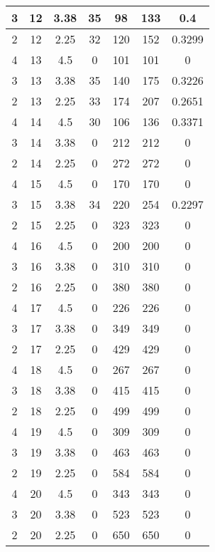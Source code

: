 \documentclass[letterpaper, 12pt]{article}
\begin{document}
\begin{longtable}{|c|c|c|c|c|c|c|}
\hline
3 & 12 & 3.38 & 35 & 98 & 133 & 0.4 \\
\hline
2 & 12 & 2.25 & 32 & 120 & 152 & 0.3299 \\
\hline
4 & 13 & 4.5 & 0 & 101 & 101 & 0 \\
\hline
3 & 13 & 3.38 & 35 & 140 & 175 & 0.3226 \\
\hline
2 & 13 & 2.25 & 33 & 174 & 207 & 0.2651 \\
\hline
4 & 14 & 4.5 & 30 & 106 & 136 & 0.3371 \\
\hline
3 & 14 & 3.38 & 0 & 212 & 212 & 0 \\
\hline
2 & 14 & 2.25 & 0 & 272 & 272 & 0 \\
\hline
4 & 15 & 4.5 & 0 & 170 & 170 & 0 \\
\hline
3 & 15 & 3.38 & 34 & 220 & 254 & 0.2297 \\
\hline
2 & 15 & 2.25 & 0 & 323 & 323 & 0 \\
\hline
4 & 16 & 4.5 & 0 & 200 & 200 & 0 \\
\hline
3 & 16 & 3.38 & 0 & 310 & 310 & 0 \\
\hline
2 & 16 & 2.25 & 0 & 380 & 380 & 0 \\
\hline
4 & 17 & 4.5 & 0 & 226 & 226 & 0 \\
\hline
3 & 17 & 3.38 & 0 & 349 & 349 & 0 \\
\hline
2 & 17 & 2.25 & 0 & 429 & 429 & 0 \\
\hline
4 & 18 & 4.5 & 0 & 267 & 267 & 0 \\
\hline
3 & 18 & 3.38 & 0 & 415 & 415 & 0 \\
\hline
2 & 18 & 2.25 & 0 & 499 & 499 & 0 \\
\hline
4 & 19 & 4.5 & 0 & 309 & 309 & 0 \\
\hline
3 & 19 & 3.38 & 0 & 463 & 463 & 0 \\
\hline
2 & 19 & 2.25 & 0 & 584 & 584 & 0 \\
\hline
4 & 20 & 4.5 & 0 & 343 & 343 & 0 \\
\hline
3 & 20 & 3.38 & 0 & 523 & 523 & 0 \\
\hline
2 & 20 & 2.25 & 0 & 650 & 650 & 0 \\
\hline
\end{longtable}
\end{document}
